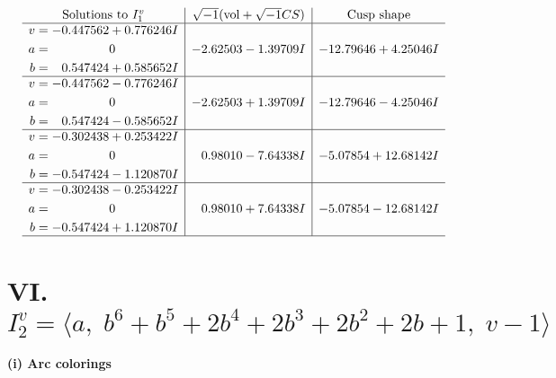 \documentclass[1p]{elsarticle_modified}
\theoremstyle{definition}
\newcommand{\I}{\sqrt{-1}}
\begin{document}
$$\begin{array}{c|c|c}  
\text{Solutions to }I^v_{1}& \I (\text{vol} + \sqrt{-1}CS) & \text{Cusp shape}\\
 \hline 
\begin{aligned}
v &= -0.447562 + 0.776246 I \\
a &= \phantom{-0.000000 } 0 \\
b &= \phantom{-}0.547424 + 0.585652 I\end{aligned}
 & -2.62503 - 1.39709 I & -12.79646 + 4.25046 I \\ \hline\begin{aligned}
v &= -0.447562 - 0.776246 I \\
a &= \phantom{-0.000000 } 0 \\
b &= \phantom{-}0.547424 - 0.585652 I\end{aligned}
 & -2.62503 + 1.39709 I & -12.79646 - 4.25046 I \\ \hline\begin{aligned}
v &= -0.302438 + 0.253422 I \\
a &= \phantom{-0.000000 } 0 \\
b &= -0.547424 - 1.120870 I\end{aligned}
 & \phantom{-}0.98010 - 7.64338 I & -5.07854 + 12.68142 I \\ \hline\begin{aligned}
v &= -0.302438 - 0.253422 I \\
a &= \phantom{-0.000000 } 0 \\
b &= -0.547424 + 1.120870 I\end{aligned}
 & \phantom{-}0.98010 + 7.64338 I & -5.07854 - 12.68142 I\\
 \hline 
 \end{array}$$\newpage\newpage\renewcommand{\arraystretch}{1}
\centering \section*{VI. $I^v_{2}= \langle a,\;b^6+b^5+2 b^4+2 b^3+2 b^2+2 b+1,\;v-1 \rangle$}
\flushleft \textbf{(i) Arc colorings}\\
\end{document}
